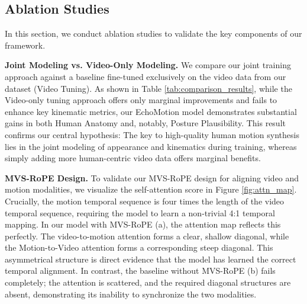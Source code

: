 \subsection{Ablation Studies}
In this section, we conduct ablation studies to validate the key components of our framework. 

\textbf{Joint Modeling vs. Video-Only Modeling.}
We compare our joint training approach against a baseline fine-tuned exclusively on the video data from our dataset (Video Tuning). As shown in Table \ref{tab:comparison_results}, while the Video-only tuning approach offers only marginal improvements and fails to enhance key kinematic metrics, our EchoMotion model demonstrates substantial gains in both Human Anatomy and, notably, Posture Plausibility.
This result confirms our central hypothesis:
The key to high-quality human motion synthesis lies in the joint modeling of appearance and kinematics during training, whereas simply adding more human-centric video data offers marginal benefits.


\textbf{MVS-RoPE Design.}
To validate our MVS-RoPE design for aligning video and motion modalities, we visualize the self-attention score in Figure \ref{fig:attn_map}. Crucially, the motion temporal sequence is four times the length of the video temporal sequence, requiring the model to learn a non-trivial 4:1 temporal mapping. In our model with MVS-RoPE (a), the attention map reflects this perfectly. The video-to-motion attention forms a clear, shallow diagonal, while the Motion-to-Video attention forms a corresponding steep diagonal. This asymmetrical structure is direct evidence that the model has learned the correct temporal alignment. In contrast, the baseline without MVS-RoPE (b) fails completely; the attention is scattered, and the required diagonal structures are absent, demonstrating its inability to synchronize the two modalities.